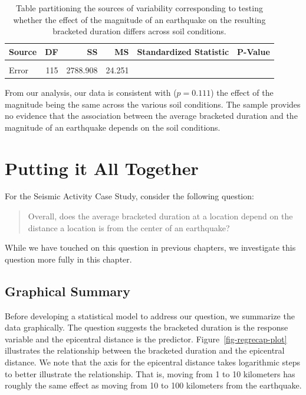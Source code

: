 \documentclass[
  letterpaper,
  DIV=11,
  numbers=noendperiod]{scrreprt}
\theoremstyle{plain}
\theoremstyle{definition}
\theoremstyle{definition}
\theoremstyle{remark}
\begin{document}
\hypertarget{tbl-regextensions-anova}{}
\begin{table}
\caption{\label{tbl-regextensions-anova}Table partitioning the sources of variability corresponding to testing
whether the effect of the magnitude of an earthquake on the resulting
bracketed duration differs across soil conditions. }\tabularnewline

\centering
\begin{tabular}[t]{lrrrrr}
\toprule
Source & DF & SS & MS & Standardized Statistic & P-Value\\
\midrule
\cellcolor{gray!6}{Additional Terms} & \cellcolor{gray!6}{1} & \cellcolor{gray!6}{62.663} & \cellcolor{gray!6}{62.663} & \cellcolor{gray!6}{2.584} & \cellcolor{gray!6}{0.111}\\
Error & 115 & 2788.908 & 24.251 &  & \\
\bottomrule
\end{tabular}
\end{table}

From our analysis, our data is consistent with (\(p = 0.111\)) the
effect of the magnitude being the same across the various soil
conditions. The sample provides no evidence that the association between
the average bracketed duration and the magnitude of an earthquake
depends on the soil conditions.

\hypertarget{sec-regrecap}{%
\chapter{Putting it All Together}\label{sec-regrecap}}

For the Seismic Activity Case Study, consider the following question:

\begin{quote}
Overall, does the average bracketed duration at a location depend on the
distance a location is from the center of an earthquake?
\end{quote}

While we have touched on this question in previous chapters, we
investigate this question more fully in this chapter.

\hypertarget{graphical-summary}{%
\section{Graphical Summary}\label{graphical-summary}}

Before developing a statistical model to address our question, we
summarize the data graphically. The question suggests the bracketed
duration is the response variable and the epicentral distance is the
predictor. Figure~\ref{fig-regrecap-plot} illustrates the relationship
between the bracketed duration and the epicentral distance. We note that
the axis for the epicentral distance takes logarithmic steps to better
illustrate the relationship. That is, moving from 1 to 10 kilometers has
roughly the same effect as moving from 10 to 100 kilometers from the
earthquake.
\end{document}
